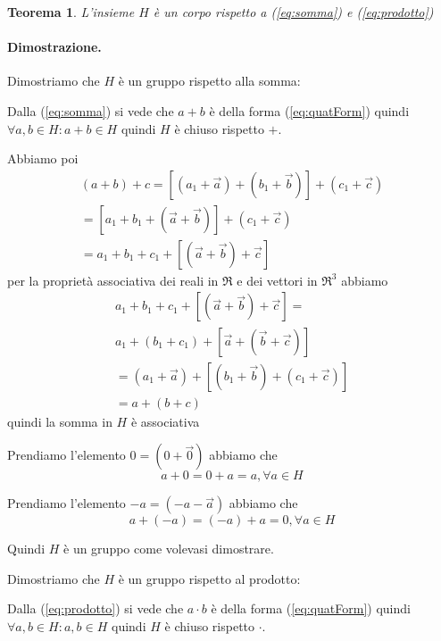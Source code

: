 \documentclass[a4paper,11pt]{article}
\newtheorem{theorem}{Teorema}
\begin{document}
\begin{theorem}
L'insieme $H$ è un corpo rispetto a (\ref{eq:somma}) e (\ref{eq:prodotto})
\end{theorem}

\paragraph{Dimostrazione.}
Dimostriamo che $H$ è un gruppo rispetto alla somma:

Dalla (\ref{eq:somma}) si vede che $a+b$ è della forma (\ref{eq:quatForm}) quindi $\forall a, b \in H: a + b \in H$ quindi $H$ è chiuso rispetto $+$.

Abbiamo poi
\begin{eqnarray*}
	(a + b) + c  = [(a_1 + \vec a) + (b_1 + \vec b)] + (c_1 + \vec c)
\\
	= [a_1 + b_1 + (\vec a + \vec b)]+ (c_1 + \vec c)
\\
	= a_1 + b_1 + c_1 + [(\vec a + \vec b) + \vec c]
\end{eqnarray*}
per la proprietà associativa dei reali in $\Re$ e dei vettori in $\Re^3$ abbiamo
\begin{eqnarray*}
	a_1 + b_1 + c_1 + [(\vec a + \vec b) + \vec c]  = 
\\
	a_1 + (b_1 + c_1) + [\vec a + (\vec b + \vec c)]
\\
	=( a_1 + \vec a) + [(b_1 + \vec b) + (c_1 + \vec c)]
\\
	=a + (b + c)
\end{eqnarray*}
quindi la somma in $H$ è associativa

Prendiamo l'elemento $0 = (0 + \vec 0)$
abbiamo che
\[
a + 0 = 0 + a = a, \forall a \in H
\]

Prendiamo l'elemento $-a = (-a - \vec a)$
abbiamo che 
\[
a + (-a) = (-a) + a = 0, \forall a \in H
\]

Quindi $H$ è un gruppo come volevasi dimostrare.

Dimostriamo che $H$ è un gruppo rispetto al prodotto:

Dalla (\ref{eq:prodotto}) si vede che $a \cdot b$ è della forma (\ref{eq:quatForm}) quindi $\forall a, b \in H: a, b \in H$ quindi $H$ è chiuso rispetto $\cdot$.
\end{document}
